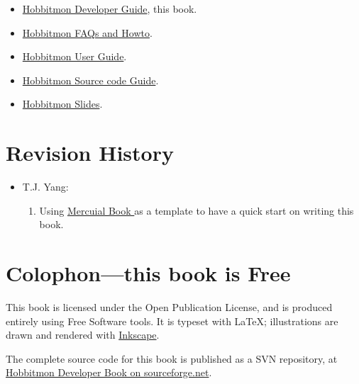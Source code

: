 \begin{itemize}
\item
  \href{http://hobbitmon.svn.sourceforge.net/viewvc/hobbitmon/branches/tjyang/src/books/hobbitmon-developer/en/}{Hobbitmon
    Developer Guide}, this book.
\item
  \href{http://hobbitmon.svn.sourceforge.net/viewvc/hobbitmon/branches/tjyang/src/books/hobbitmon-faq-howto/en/}{Hobbitmon
    FAQs and Howto}.
\item
  \href{http://hobbitmon.svn.sourceforge.net/viewvc/hobbitmon/branches/tjyang/src/books/hobbitmon-user-guide/en/}{Hobbitmon
    User Guide}.
\item
  \href{http://hobbitmon.svn.sourceforge.net/viewvc/hobbitmon/branches/tjyang/src/books/hobbitmon-sourcecode-guide/en/}{Hobbitmon
Source code Guide}.
\item
  \href{http://hobbitmon.svn.sourceforge.net/viewvc/hobbitmon/branches/tjyang/src/hobbitmon-slides/}{Hobbitmon
    Slides}.

\end{itemize}

\section{Revision History}

\begin{itemize}
\item T.J. Yang:
 \begin{enumerate}
  \item Using \href{http://hg.serpentine.com/mercurial/book/}{Mercuial Book } as a template to have a quick start on
    writing this book.
 \end{enumerate}

\end{itemize}

\section{Colophon---this book is Free}

This book is licensed under the Open Publication License, and is
produced entirely using Free Software tools.  It is typeset with
\LaTeX{}; illustrations are drawn and rendered with
\href{http://www.inkscape.org/}{Inkscape}.

The complete source code for this book is published as a SVN
repository, at
\href{http://hobbitmon.svn.sourceforge.net/viewvc/hobbitmon/branches/tjyang/src/books/hobbitmon-developer/en/}{Hobbitmon
  Developer Book on sourceforge.net}.


